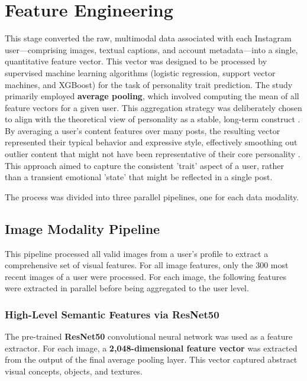 \section{Feature Engineering}
\label{subsec:features}
This stage converted the raw, multimodal data associated with each Instagram user—comprising images, textual captions, and account metadata—into a single, quantitative feature vector. This vector was designed to be processed by supervised machine learning algorithms (logistic regression, support vector machines, and XGBoost) for the task of personality trait prediction. The study primarily employed \textbf{average pooling}, which involved computing the mean of all feature vectors for a given user. This aggregation strategy was deliberately chosen to align with the theoretical view of personality as a stable, long-term construct \citep{babcock2020big}. By averaging a user's content features over many posts, the resulting vector represented their typical behavior and expressive style, effectively smoothing out outlier content that might not have been representative of their core personality \citep{azucar_predicting_2018}. This approach aimed to capture the consistent 'trait' aspect of a user, rather than a transient emotional 'state' that might be reflected in a single post.

The process was divided into three parallel pipelines, one for each data modality.

\subsection{Image Modality Pipeline}
This pipeline processed all valid images from a user's profile to extract a comprehensive set of visual features. For all image features, only the 300 most recent images of a user were processed. For each image, the following features were extracted in parallel before being aggregated to the user level.

\subsubsection{High-Level Semantic Features via ResNet50}
The pre-trained \textbf{ResNet50} convolutional neural network was used as a feature extractor. For each image, a \textbf{2,048-dimensional feature vector} was extracted from the output of the final average pooling layer. This vector captured abstract visual concepts, objects, and textures.

